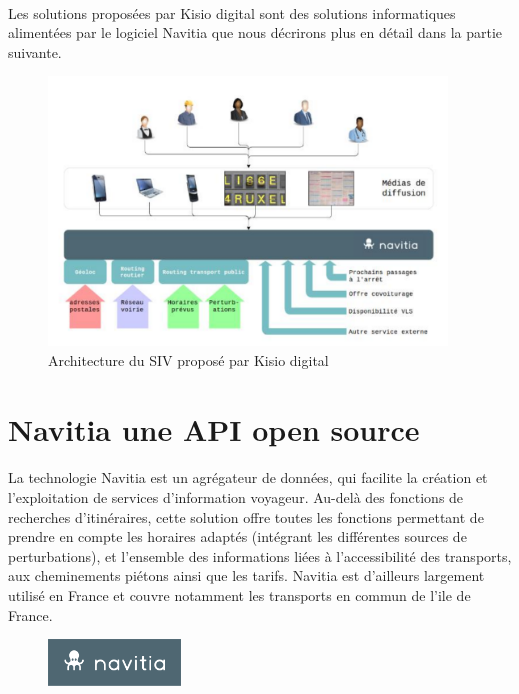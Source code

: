 \documentclass[a4paper]{report}
\begin{document}
\paragraph{} Les solutions proposées par Kisio digital sont des solutions informatiques alimentées par le logiciel Navitia que nous décrirons plus en détail dans la partie suivante. 

\begin{figure}[H] 
	\begin{center}
		\includegraphics[width=300pt]{image/archi_SIV}
		\caption{Architecture du SIV proposé par Kisio digital}
		\label{Architecture du SIV proposé par Kisio digital}
	\end{center}
\end{figure}

\section{Navitia une API open source}

\paragraph{}La technologie Navitia est un agrégateur de données, qui facilite la création et l’exploitation de services d’information voyageur. Au-delà des fonctions de recherches d’itinéraires, cette solution offre toutes les fonctions permettant de prendre en compte les horaires adaptés (intégrant les différentes sources de perturbations), et l’ensemble des informations liées à l’accessibilité des transports, aux cheminements piétons ainsi que les tarifs. Navitia est d’ailleurs largement utilisé en France et couvre notamment les transports en commun de l’ile de France.  

\begin{figure}[H] 
	\begin{center}
		\includegraphics[width=100pt]{image/logo_navitia}
	\end{center}
\end{figure}
\end{document}
